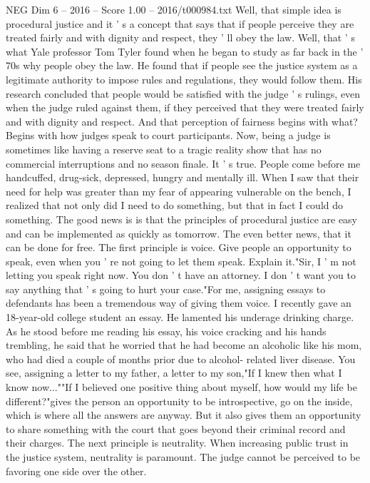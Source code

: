 \begin{textsample}{NEG Dim 6 – 2016 – Score 1.00 – 2016/t000984.txt}
Well, that simple idea is procedural justice and it ' s a concept that says that if people perceive they are treated fairly and with dignity and respect, they ' ll obey the law.
Well, that ' s what Yale professor Tom Tyler found when he began to study as far back in the ' 70s why people obey the law.
He found that if people see the justice system as a legitimate authority to impose rules and regulations, they would follow them.
His research concluded that people would be satisfied with the judge ' s rulings, even when the judge ruled against them, if they perceived that they were treated fairly and with dignity and respect.
And that perception of fairness begins with what?
Begins with how judges speak to court participants.
Now, being a judge is sometimes like having a reserve seat to a tragic reality show that has no commercial interruptions and no season finale.
It ' s true.
People come before me handcuffed, drug-sick, depressed, hungry and mentally ill.
When I saw that their need for help was greater than my fear of appearing vulnerable on the bench, I realized that not only did I need to do something, but that in fact I could do something.
The good news is is that the principles of procedural justice are easy and can be implemented as quickly as tomorrow.
The even better news, that it can be done for free.
The first principle is voice.
Give people an opportunity to speak, even when you ' re not going to let them speak.
Explain it."Sir, I ' m not letting you speak right now.
You don ' t have an attorney.
I don ' t want you to say anything that ' s going to hurt your case."For me, assigning essays to defendants has been a tremendous way of giving them voice.
I recently gave an 18-year-old college student an essay.
He lamented his underage drinking charge.
As he stood before me reading his essay, his voice cracking and his hands trembling, he said that he worried that he had become an alcoholic like his mom, who had died a couple of months prior due to alcohol- related liver disease.
You see, assigning a letter to my father, a letter to my son,"If I knew then what I know now...""If I believed one positive thing about myself, how would my life be different?"gives the person an opportunity to be introspective, go on the inside, which is where all the answers are anyway.
But it also gives them an opportunity to share something with the court that goes beyond their criminal record and their charges.
The next principle is neutrality.
When increasing public trust in the justice system, neutrality is paramount.
The judge cannot be perceived to be favoring one side over the other.

\end{textsample}
